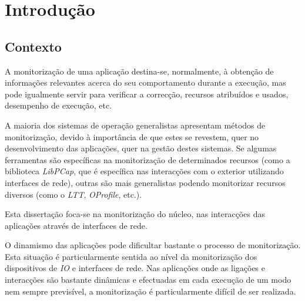 \chapter{Introdução}\label{cap:introducao}

\section{Contexto}
\label{sec:intro_context}
A monitorização de uma aplicação destina-se, normalmente, à obtenção de informações relevantes acerca do seu comportamento durante a execução, mas pode igualmente servir para verificar a correcção, recursos atribuídos e usados, desempenho de execução, etc.

A maioria dos sistemas de operação generalistas apresentam métodos de monitorização, devido à importância de que estes se revestem, quer no desenvolvimento das aplicações, quer na gestão destes sistemas.
Se algumas ferramentas são específicas na monitorização de determinados recursos (como a biblioteca \textit{LibPCap}, que é específica nas interacções com o exterior utilizando interfaces de rede), outras são mais generalistas podendo monitorizar recursos diversos (como o \textit{LTT}, \textit{OProfile}, etc.).

Esta dissertação foca-se na monitorização do núcleo, nas interacções das aplicações através de interfaces de rede.

O dinamismo das aplicações pode dificultar bastante o processo de monitorização.
Esta situação é particularmente sentida ao nível da monitorização dos dispositivos de \textit{IO} e interfaces de rede.
Nas aplicações onde as ligações e interacções são bastante dinâmicas e efectuadas em cada execução de um modo nem sempre previsível, a monitorização é particularmente difícil de ser realizada.

